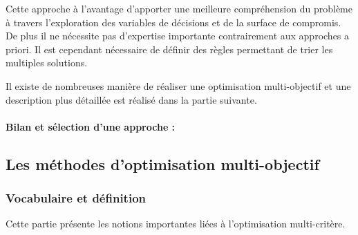 
Cette approche à l’avantage d’apporter une meilleure compréhension du problème à
travers l’exploration des variables de décisions et de la surface de compromis.
De plus il ne nécessite pas d’expertise importante contrairement aux approches a priori.
Il est cependant nécessaire de définir des règles permettant de trier les multiples solutions.

Il existe de nombreuses manière de réaliser une optimisation multi-objectif et une
description plus détaillée est réalisé dans la partie suivante.

\paragraph{Bilan et sélection d’une approche :} %
\label{par:bilan_et_selection_d_une_approche}



\subsection{Les méthodes d’optimisation multi-objectif} %
\label{sub:les_methodes_d_optimisation_multi_objectif}
\subsubsection{Vocabulaire et définition} %
\label{ssub:vocabulaire_et_definition}
Cette partie présente les notions importantes liées à l’optimisation multi-critère.
